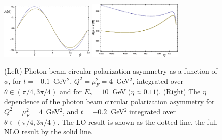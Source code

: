 \begin{figure}[ht]
\begin{center}
  \includegraphics[width=0.4\textwidth]{Asymmetry_E_10_t_01_Q_2_nice.eps}
  \hspace{0.05\textwidth}
  \includegraphics[width=0.4\textwidth]{Asymmetry_xi_nice.eps}
\caption{
(Left) Photon beam  circular polarization asymmetry as a function of $\phi$,
for $t=-0.1$~GeV$^2$, $Q^2 = \mu_F^2 = 4$~GeV$^2$, integrated over $\theta
\in (\pi/4,3\pi/4)$ and for $E_\gamma = 10$~GeV ($\eta \approx 0.11$).
(Right) The $\eta$ dependence of the photon beam circular polarization
asymmetry for $Q^2 = \mu_F^2 = 4$~GeV$^2$, and $t= -0.2$~GeV$^2$ integrated
over $\theta \in (\pi/4,3\pi/4)$. The LO result is shown as the dotted line,
the full NLO result by the solid line.}
\label{fig:Asymmetry_xi}
\end{center}
\end{figure}
